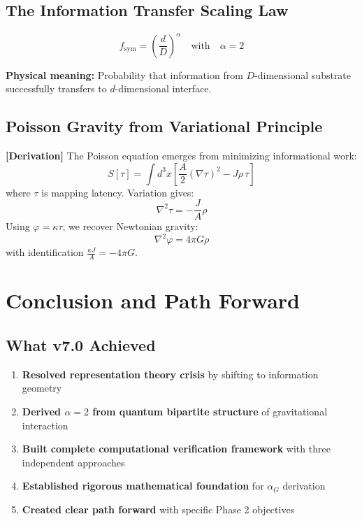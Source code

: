\documentclass[11pt,titlepage]{article}
\newcommand{\tagderiv}{\textcolor{orange!70!black}{\textbf{[Derivation]}} }
\begin{document}
\subsection{The Information Transfer Scaling Law}

\[
f_{\mathrm{sym}} = \left(\frac{d}{D}\right)^\alpha \quad \text{with} \quad \alpha = 2
\]

\textbf{Physical meaning:} Probability that information from $D$-dimensional substrate successfully transfers to $d$-dimensional interface.

\subsection{Poisson Gravity from Variational Principle}

\tagderiv The Poisson equation emerges from minimizing informational work:
\[
S[\tau] = \int d^3x \left[ \frac{A}{2} (\nabla\tau)^2 - J\rho\,\tau \right]
\]
where $\tau$ is mapping latency. Variation gives:
\[
\nabla^2\tau = -\frac{J}{A}\rho
\]
Using $\varphi = \kappa\tau$, we recover Newtonian gravity:
\[
\nabla^2\varphi = 4\pi G\rho
\]
with identification $\frac{\kappa J}{A} = -4\pi G$.


\section{Conclusion and Path Forward}

\subsection{What v7.0 Achieved}

\begin{enumerate}
\item \textbf{Resolved representation theory crisis} by shifting to information geometry
\item \textbf{Derived $\alpha=2$ from quantum bipartite structure} of gravitational interaction
\item \textbf{Built complete computational verification framework} with three independent approaches
\item \textbf{Established rigorous mathematical foundation} for $\alpha_G$ derivation
\item \textbf{Created clear path forward} with specific Phase 2 objectives
\end{enumerate}
\end{document}
